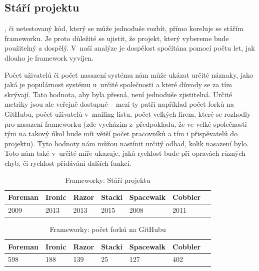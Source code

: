 \subsection{Stáří projektu}

, či netestovaný kód, který se může jednoduše rozbít, přímo koreluje se stářím frameworku. Je proto důležité se ujistit, že projekt, který vybereme bude použitelný a dospělý.  V~naší analýze je dospělost spočítána pomocí počtu let, jak dlouho je framework vyvíjen.

Počet uživatelů či počet nasazení systému nám může ukázat určité náznaky, jako jaká je populárnost systému u~určité společnosti a které důvody se za tím skrývají. Tato hodnota, aby byla přesná, není jednoduše zjistitelná. Určité metriky jsou ale veřejně dostupné -- mezi ty patří například počet forků na GitHubu, počet uživatelů v~mailing listu, počet velkých firem, které se rozhodly pro nasazení frameworku (zde vycházím z~předpokladu, že ve velké společnosti tým na takový úkol bude mít větší počet pracovníků a tím i přispěvatelů do projektu). Tyto hodnoty nám můžou nastínit určitý odhad, kolik nasazení bylo. Toto nám také v~určité míře ukazuje, jaká rychlost bude při opravách různých chyb, či rychlost přidávání dalších funkcí.



\begin{table}[h]
\centering
\caption{Frameworky: Stáří projektu}
\label{Frameworky_oldness}
\begin{tabular}{lllllll}
\toprule

 Foreman & Ironic & Razor & Stacki & Spacewalk & Cobbler \\ \midrule
  2009        & 2013       &  2013     & 2015       &  2008         & 2011
\end{tabular}
\end{table}

\begin{table}[h]
\centering
\caption{Frameworky: počet forků na GitHubu}
\label{Frameworky_oldness}
\begin{tabular}{lllllll}
\toprule

 Foreman & Ironic & Razor & Stacki & Spacewalk & Cobbler \\ \midrule
  598        & 188       &  139     & 25       &  127         & 402
\end{tabular}
\end{table}


%
%
%
%

